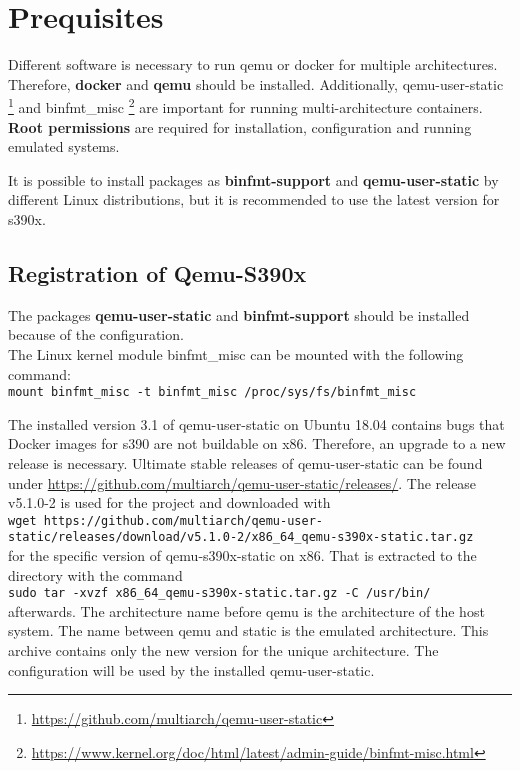 \chapter{Prequisites}\label{ch:prequisites}


Different software is necessary to run qemu or docker for multiple architectures. Therefore, \textbf{docker} and \textbf{qemu} should be installed. Additionally, qemu-user-static \footnote{\url{https://github.com/multiarch/qemu-user-static}} and binfmt\_misc \footnote{\url{https://www.kernel.org/doc/html/latest/admin-guide/binfmt-misc.html}} are important for running multi-architecture containers. \\
\textbf{Root permissions} are required for installation, configuration and running emulated systems.

It is possible to install packages as \textbf{binfmt-support} and \textbf{qemu-user-static} by different Linux distributions, but it is recommended to use the latest version for s390x. \\

\section{Registration of Qemu-S390x}\label{Qemu-S390-Registration}

The packages \textbf{qemu-user-static} and \textbf{binfmt-support} should be installed because of the configuration. \\

The Linux kernel module binfmt\_misc can be mounted with the following command: \\
\lstinline!mount binfmt_misc -t binfmt_misc /proc/sys/fs/binfmt_misc!

The installed version 3.1 of qemu-user-static on Ubuntu 18.04 contains bugs that Docker images for s390 are not buildable on x86. Therefore, an upgrade to a new release is necessary.
Ultimate stable releases of qemu-user-static can be found under \url{https://github.com/multiarch/qemu-user-static/releases/}. The release v5.1.0-2 is used for the project and downloaded with \\
\lstinline!wget https://github.com/multiarch/qemu-user-static/releases/download/v5.1.0-2/x86_64_qemu-s390x-static.tar.gz! \\ 
for the specific version of qemu-s390x-static on x86. That is extracted to the directory  with the command \\ 
\lstinline!sudo tar -xvzf x86_64_qemu-s390x-static.tar.gz -C /usr/bin/! \\
afterwards. 
The architecture name before qemu is the architecture of the host system. The name between qemu and static is the emulated architecture. This archive contains only the new version for the unique architecture. The configuration will be used by the installed qemu-user-static.\\

